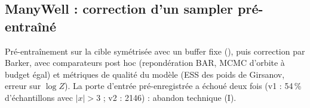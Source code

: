 \subsection{ManyWell : correction d'un sampler pré-entraîné}
Pré-entraînement sur la cible symétrisée avec un buffer fixe (), puis correction par Barker, avec comparateurs post hoc (repondération BAR, MCMC d'orbite à budget égal) et métriques de qualité du modèle (ESS des poids de Girsanov, erreur sur $\log Z$). La porte d'entrée pré-enregistrée a échoué deux fois (v1 : 54\,\% d'échantillons avec $|x|>3$ ; v2 :  2146) : abandon technique (I).
